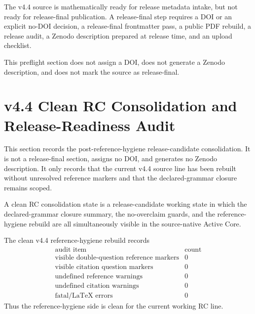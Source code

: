 \begin{theorem}
The v4.4 source is mathematically ready for release metadata intake, but not
ready for release-final publication.  A release-final step requires a DOI or an
explicit no-DOI decision, a release-final frontmatter pass, a public PDF
rebuild, a release audit, a Zenodo description prepared at release time, and an
upload checklist.
\end{theorem}

\begin{remark}
This preflight section does not assign a DOI, does not generate a Zenodo
description, and does not mark the source as release-final.
\end{remark}



\section{v4.4 Clean RC Consolidation and Release-Readiness Audit}
\label{sec:v45-clean-rc-consolidation-release-readiness-audit}

This section records the post-reference-hygiene release-candidate consolidation.
It is not a release-final section, assigns no DOI, and generates no Zenodo
description.  It only records that the current v4.4 source line has been
rebuilt without unresolved reference markers and that the declared-grammar
closure remains scoped.

\begin{definition}
A clean RC consolidation state is a release-candidate working state in which
the declared-grammar closure summary, the no-overclaim guards, and the
reference-hygiene rebuild are all simultaneously visible in the source-native
Active Core.
\end{definition}

\begin{proposition}
The clean v4.4 reference-hygiene rebuild records
\[
\begin{array}{c|r}
\text{audit item} & \text{count}\\
\hline
\text{visible double-question reference markers} & 0\\
\text{visible citation question markers} & 0\\
\text{undefined reference warnings} & 0\\
\text{undefined citation warnings} & 0\\
\text{fatal/LaTeX errors} & 0
\end{array}
\]
Thus the reference-hygiene side is clean for the current working RC line.
\end{proposition}

